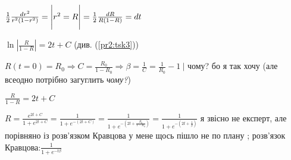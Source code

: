 $\frac{1}{2}\frac{dr^2}{r^2(1-r^2)} = \Bigg{|} r^2 = R \Bigg{|} = \frac{1}{2}\frac{dR}{R(1-R)} = dt$ 

$\ln |\frac{R}{1-R}| = 2t + C$ (див. (\ref{pr2:tsk3}))

$R(t= 0) = R_0 \Longrightarrow C = \frac{R_0}{1-R_0} \Longrightarrow \beta = \frac{1}{C} = \frac{1}{R_0} - 1 \ \Bigg |$ чому? бо я так хочу (але всеодно потрібно загуглить \textit{чому?})


$\frac{R}{1-R} = 2t + C$

$R = \frac{e^{2t + C}}{1+e^{2t + C}} = \frac{1}{1+e^{-(2t+C)}} = \frac{1}{1+e^{-(2t + \frac{R_0}{1-R_0})}} = \frac{1}{1+e^{-(2t + \frac{1}{\beta})}}$
я звісно не експерт, але порівняно із розв'язком Кравцова у мене щось пішло не по плану ; розв'язок Кравцова:$ \frac{1}{1+e^{-t\beta}}$